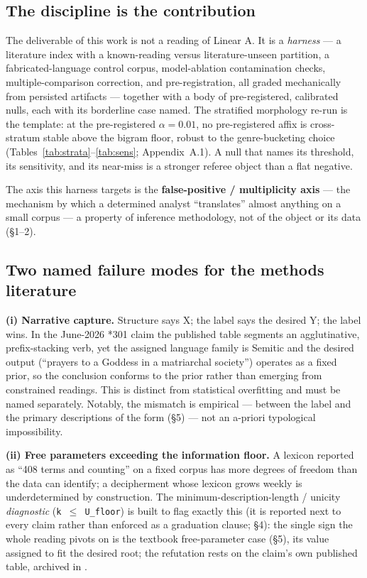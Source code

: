 \subsection{The discipline is the contribution}

The deliverable of this work is not a reading of Linear A. It is a
\emph{harness} --- a literature index with a known-reading versus
literature-unseen partition, a fabricated-language control corpus,
model-ablation contamination checks, multiple-comparison correction, and
pre-registration, all graded mechanically from persisted artifacts ---
together with a body of pre-registered, calibrated nulls, each with its
borderline case named. The stratified morphology re-run is the template: at
the pre-registered $\alpha = 0.01$, no pre-registered affix is cross-stratum
stable above the bigram floor, robust to the genre-bucketing choice
(Tables~\ref{tab:strata}--\ref{tab:sens}; Appendix~A.1). A null that
names its threshold, its sensitivity, and its
near-miss is a stronger referee object than a flat negative.

The axis this harness targets is the \textbf{false-positive / multiplicity
axis} --- the mechanism by which a determined analyst ``translates'' almost
anything on a small corpus --- a property of inference methodology, not of
the object or its data (\S1--2).

\subsection{Two named failure modes for the methods literature}

\textbf{(i) Narrative capture.} Structure says X; the label says the
desired Y; the label wins. In the June-2026 *301 claim the published table
segments an agglutinative, prefix-stacking verb, yet the assigned language
family is Semitic and the desired output (``prayers to a Goddess in a
matriarchal society'') operates as a fixed prior, so the conclusion
conforms to the prior rather than emerging from constrained readings. This
is distinct from statistical overfitting and must be named separately.
Notably, the mismatch is empirical --- between the label and the primary
descriptions of the form (\S5) --- not an a-priori typological
impossibility.

\textbf{(ii) Free parameters exceeding the information floor.} A lexicon
reported as ``408 terms and counting'' on a fixed corpus has more degrees
of freedom than the data can identify; a decipherment whose lexicon grows
weekly is underdetermined by construction. The minimum-description-length /
unicity \emph{diagnostic} (\texttt{k $\le$ U\_floor}) is built to flag
exactly this (it is reported next to every claim rather than enforced as a
graduation clause; \S4): the single sign the whole
reading pivots on is the textbook free-parameter case (\S5), its value
assigned to fit the desired root; the refutation rests on the claim's own
published table, archived in \artobj.

